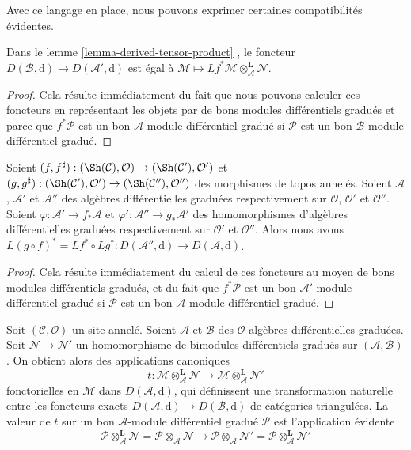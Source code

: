 \noindent
Avec ce langage en place, nous pouvons exprimer certaines compatibilités évidentes.

\begin{lemma}
\label{lemma-compose-pullback-tensor}
Dans le lemme \ref{lemma-derived-tensor-product} , le foncteur $D(\mathcal{B}, \text{d}) \to D(\mathcal{A}', \text{d})$ est égal à $\mathcal{M} \mapsto Lf^*\mathcal{M} \otimes_\mathcal{A}^\mathbf{L} \mathcal{N}$.
\end{lemma}

\begin{proof}
Cela résulte immédiatement du fait que nous pouvons calculer ces foncteurs en représentant les objets par de bons modules différentiels gradués et parce que $f^*\mathcal{P}$ est un bon $\mathcal{A}$-module différentiel gradué si $\mathcal{P}$ est un bon $\mathcal{B}$-module différentiel gradué.
\end{proof}

\begin{lemma}
\label{lemma-compose-pullback}
Soient $(f, f^\sharp) : (\Sh(\mathcal{C}), \mathcal{O}) \to (\Sh(\mathcal{C}'), \mathcal{O}')$ et $(g, g^\sharp) : (\Sh(\mathcal{C}'), \mathcal{O}') \to (\Sh(\mathcal{C}''), \mathcal{O}'')$ des morphismes de topos annelés.
Soient $\mathcal{A}$, $\mathcal{A}'$ et $\mathcal{A}''$ des algèbres différentielles graduées respectivement sur $\mathcal{O}$, $\mathcal{O}'$ et $\mathcal{O}''$.
Soient $\varphi : \mathcal{A}' \to f_*\mathcal{A}$ et $\varphi' : \mathcal{A}'' \to g_*\mathcal{A}'$ des homomorphismes d'algèbres différentielles graduées respectivement sur $\mathcal{O}'$ et $\mathcal{O}''$.
Alors nous avons $L(g \circ f)^* = Lf^* \circ Lg^* : D(\mathcal{A}'', \text{d}) \to D(\mathcal{A}, \text{d})$.
\end{lemma}

\begin{proof}
Cela résulte immédiatement du calcul de ces foncteurs au moyen de bons modules différentiels gradués, et du fait que $f^*\mathcal{P}$ est un bon $\mathcal{A}'$-module différentiel gradué si $\mathcal{P}$ est un bon $\mathcal{A}$-module différentiel gradué.
\end{proof}

\noindent
Soit $(\mathcal{C}, \mathcal{O})$ un site annelé.
Soient $\mathcal{A}$ et $\mathcal{B}$ des $\mathcal{O}$-algèbres différentielles graduées.
Soit $\mathcal{N} \to \mathcal{N}'$ un homomorphisme de bimodules différentiels gradués sur $(\mathcal{A}, \mathcal{B})$.
On obtient alors des applications canoniques
$$
t :
\mathcal{M} \otimes_\mathcal{A}^\mathbf{L} \mathcal{N}
\longrightarrow
\mathcal{M} \otimes_\mathcal{A}^\mathbf{L} \mathcal{N}'
$$
fonctorielles en $\mathcal{M}$ dans $D(\mathcal{A}, \text{d})$, qui définissent une transformation naturelle entre les foncteurs exacts $D(\mathcal{A}, \text{d}) \to D(\mathcal{B}, \text{d})$ de catégories triangulées.
La valeur de $t$ sur un bon $\mathcal{A}$-module différentiel gradué $\mathcal{P}$ est l'application évidente
$$
\mathcal{P} \otimes_\mathcal{A}^\mathbf{L} \mathcal{N} =
\mathcal{P} \otimes_\mathcal{A} \mathcal{N}
\longrightarrow
\mathcal{P} \otimes_\mathcal{A} \mathcal{N}' =
\mathcal{P} \otimes_\mathcal{A}^\mathbf{L} \mathcal{N}'
$$

